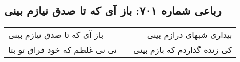 \begin{center}
\section*{رباعی شماره ۷۰۱: باز آی که تا صدق نیازم بینی}
\label{sec:sh701}
\begin{longtable}{l p{0.5cm} r}
باز آی که تا صدق نیازم بینی
&&
بیداری شبهای درازم بینی
\\
نی نی غلطم که خود فراق تو بتا
&&
کی زنده گذاردم که بازم بینی
\\
\end{longtable}
\end{center}

